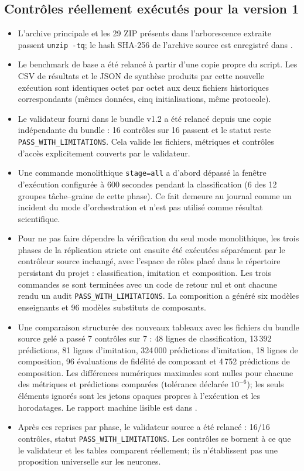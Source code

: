 \documentclass[11pt,a4paper,oneside]{report}
\begin{document}
\subsection{Contrôles réellement exécutés pour la version 1}
\begin{itemize}
\item L'archive principale et les 29 ZIP présents dans l'arborescence extraite passent \texttt{unzip -tq}; le hash SHA-256 de l'archive source est enregistré dans .
\item Le benchmark de base a été relancé à partir d'une copie propre du script. Les CSV de résultats et le JSON de synthèse produits par cette nouvelle exécution sont identiques octet par octet aux deux fichiers historiques correspondants (mêmes données, cinq initialisations, même protocole).
\item Le validateur fourni dans le bundle v1.2 a été relancé depuis une copie indépendante du bundle : 16 contrôles sur 16 passent et le statut reste \texttt{PASS\_WITH\_LIMITATIONS}. Cela valide les fichiers, métriques et contrôles d'accès explicitement couverts par le validateur.
\item Une commande monolithique \texttt{stage=all} a d'abord dépassé la fenêtre d'exécution configurée à 600 secondes pendant la classification (6 des 12 groupes tâche--graine de cette phase). Ce fait demeure au journal comme un incident du mode d'orchestration et n'est pas utilisé comme résultat scientifique.
\item Pour ne pas faire dépendre la vérification du seul mode monolithique, les trois phases de la réplication stricte ont ensuite été exécutées séparément par le contrôleur source inchangé, avec l'espace de rôles placé dans le répertoire persistant du projet : classification, imitation et composition. Les trois commandes se sont terminées avec un code de retour nul et ont chacune rendu un audit \texttt{PASS\_WITH\_LIMITATIONS}. La composition a généré six modèles enseignants et 96 modèles substituts de composants.
\item Une comparaison structurée des nouveaux tableaux avec les fichiers du bundle source gelé a passé 7 contrôles sur 7 : 48 lignes de classification, 13\,392 prédictions, 81 lignes d'imitation, 324\,000 prédictions d'imitation, 18 lignes de composition, 96 évaluations de fidélité de composant et 4\,752 prédictions de composition. Les différences numériques maximales sont nulles pour chacune des métriques et prédictions comparées (tolérance déclarée \(10^{-6}\)); les seuls éléments ignorés sont les jetons opaques propres à l'exécution et les horodatages. Le rapport machine lisible est dans .
\item Après ces reprises par phase, le validateur source a été relancé : 16/16 contrôles, statut \texttt{PASS\_WITH\_LIMITATIONS}. Les contrôles se bornent à ce que le validateur et les tables comparent réellement; ils n'établissent pas une proposition universelle sur les neurones.
\end{itemize}
\end{document}
